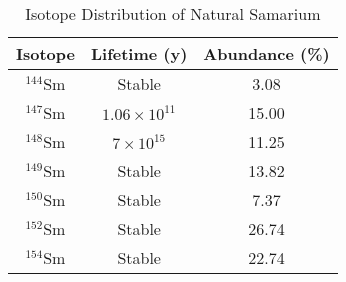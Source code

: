 \begin{table}[]
    \centering
    \begin{tabular}{c|c|c}
    \toprule
         Isotope & Lifetime (y) & Abundance (\%)  \\
         \hline
         $^{144}$Sm & Stable & 3.08 \\
         $^{147}$Sm & $1.06\times10^{11}$ & 15.00 \\
         $^{148}$Sm & $7\times10^{15}$ & 11.25 \\
         $^{149}$Sm & Stable & 13.82 \\
         $^{150}$Sm & Stable & 7.37 \\
         $^{152}$Sm & Stable & 26.74 \\
         $^{154}$Sm & Stable & 22.74 \\
         \bottomrule
    \end{tabular}
    \caption{Isotope Distribution of Natural Samarium}
    \label{tab:nat_Sm}
\end{table}